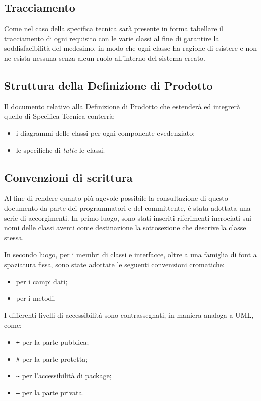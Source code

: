 {\subsection{Tracciamento}
Come nel caso della specifica tecnica sarà presente in forma tabellare il tracciamento di ogni requisito con le varie classi al fine di garantire la soddisfacibilità del medesimo, in modo che ogni classe ha ragione di esistere e non ne esista nessuna senza alcun ruolo all'interno del sistema creato.

\subsection{Struttura della Definizione di Prodotto}
Il documento relativo alla Definizione di Prodotto che estenderà ed integrerà quello di Specifica Tecnica conterrà:
\begin{itemize}
\item i diagrammi delle classi per ogni componente evedenziato;
\item le specifiche di \textit{tutte} le classi.
\end{itemize}

\subsection{Convenzioni di scrittura}
Al fine di rendere quanto più agevole possibile la consultazione di questo documento da parte dei programmatori e del committente, è stata adottata una serie di accorgimenti. In primo luogo, sono stati inseriti riferimenti incrociati sui nomi delle classi aventi come destinazione la sottosezione che descrive la classe stessa.

In secondo luogo, per i membri di classi e interfacce, oltre a una famiglia di font a spaziatura fissa, sono state adottate le seguenti convenzioni cromatiche:
\begin{itemize}[noitemsep,nolistsep]
\item {} per i campi dati;
\item {} per i metodi.
\end{itemize}
I differenti livelli di accessibilità sono contrassegnati, in maniera analoga a UML, come:
\begin{itemize}
  \item \texttt{\ttfamily +} per la parte pubblica;
  \item \texttt{\ttfamily \#} per la parte protetta;
  \item \texttt{\ttfamily \textasciitilde} per  l'accessibilità di package;
  \item \texttt{\ttfamily --} per la parte privata.
\end{itemize}

}
